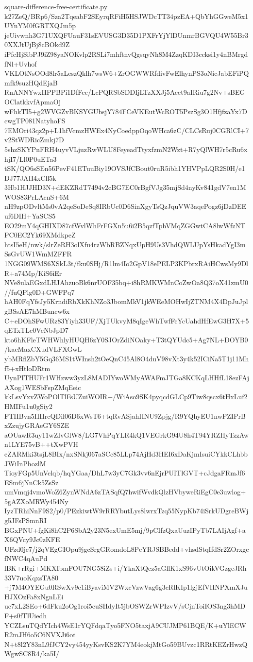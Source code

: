 \documentclass[11pt]{article}
\theoremstyle{definition}
\theoremstyle{remark}
\begin{document}
\begin{filecontents*}[overwrite]{square-difference-free-certificate.py}
k27ZeQ/BRp6/Sza2TqeabF2SEyrqRFiH5HSJWDcTT34pzEA+QbYhGGweM5x1UYnYM0fGRTXQJm5p
jeUivwnh3G71UXQFUauF31sEVUSG3D35D1PXFrYjYlDUnmrBGVQU4W55Br30XXJtUjBj8cBOkd9Z
iPfcHjSibPJ9iZ98yaNOKvlp2RSLi7mhftnvQgsqyNh8M4ZzqKDI3ccksi1y4nBMrgdfNl+Uvhof
VKLOtNsOOd8lr5aLeszQklh7wsW6+ZrOGWWRfdivFwElhynPS3oNicJabEFiPQmfk9suzHQdEjaB
RnANNYwxHPPBPi1DfFec/LcPQRSbSDDIjLTzXXJj5Acet9aIRiu7g2Nv+sBEGOClatkkvfApmaOj
wFhkTI5+g2WVGZvBKSYGUbsjY784FCeVKEutWcROT5PszSg3O1HfjfzaYx7DcwgTP081NatyhoFS
7EMOri43qz2p+L1hfVcmzHWEx4NyCoedppOqoWHca6zC/CLCsRuj0CGRlCI+7v2StWDRicZmkj7D
5shzSKYPnFRH4uyvVLjuzRwWLU8FeyeadTtyxfzmN2Wzt+R7yQlWH7r5cRu6xhjI7/Ll0P0uETa3
tSK/QO6sSEn56PevF41ETuuBiy19OVSJfCBout0ruR5ibh1YHVPpLQR2S0H/e1DJ77JAH4xCll5k
3Hb1HJJHD3N+dEKZRdT7494v2cBG7EC0rBgfVJg35mjSd4nyKv841gdV7en1MWOS83PrLAcnS+6M
nH9zpODvltMs0vA2qeSoDeSq8IRbUc0D6SinXgyTsQzJquVW3aqePogz6jDzDEEuf6DIH+YaSCS5
EO29mY4qGHIXD87cfWvlWhFrFGXn5u6i2B5qzfTphVMqZGGwtCA8lwWfzNTPC0EC2Yk69XMdkpeZ
htsI5eH/nwk/slrZeRH3olXfu4rzWbRBZNqxUpH9Us3VhdQWLUpYsHkadYgI3mSsGvUW1WmMZFFR
1NGG09WMS6XSkL3t/fku0SHj/R1lm4Io2GpV18ePELP3KPbrxRAiHCwsMy9DlR+a74Mp/KiS6iEr
NVe8ulaEGxdLHJAhzuoBk6nrUOF35bq+i8hRMKWMnCoZwOa8Q37oX41zmU0//fuQPlg0D+GWFPq7
hAH0FqYfsJy5KrndiRbXkKhNZo3JbomMkV1jkWEeMOHwIjZTNM4X4DpJuJplgBSsAE7hMBuncw6x
C+eDOhSFwURz83Yiyh33UF/XjTUkvyM8qIgeWhTwfFcYcUahdHfEwG3H7X+5qETxTLe0VeNbJpD7
kto6hKFleTWHWhlyHUQH6zY0SJOrZdiNOaky+T3tQYUdc5+Ag7NL+DOYB0/kaeMaxCXudVLFXGwL
ybMRfiZbY5Gq36MS1tWInsh2tOeQnC45Al8O4duV98vXt3y4k52ICiNa5T1j11Mhf5+xHtloDRtm
UynPITHUFr1WHzww3yzL8MADIYwoWMyAWAFmJTGa8KCKqLHHfL18ezFAjAXog1WESbFspZMqEeic
kkLsvYxvZWoPOlTlFsUZuiWOIR+/WiAso9SK4pyqcdGLCp9Tiw8qscx6tHxLuf2HMIFu1u0gSiy2
FTHBvn5HHrcQDil06D6xWsT6+tqRvASjahHNU9Zpjg/R9YQhyEU1nwPZIPrBxZzujyGRAeGY6SZE
aOUawR3uy11wZIvGlW8/LG7VhPqYLR4kQ1VEGrkG94U8h4T94YRZHyTzzAwn1LYE75vB++tXwPVH
eZARMki3tsjL8BIx/nxSNkj067aSCc85LLp74AjHd3HEI6xDaKjmIsuiCYkkCLhbbJWiInPhozlM
TioyFGp5UnVclqb/hqYGaa/DhL7w3yC7Gk3vv6nEjrPUITlGVT+cJdgaFRmJf6ESm6jNnCk5ZsSz
umVmqj4vmoWoZ6ZynWNdA6zTASqfQ7hwifWvdkQlzHVbyweRiEgC0e3uwlog+5gAZXoMRWy454Ny
IyzTRhiNnF9S2/p0/PEzkiwtW9rRRYbutLys8lwrxTzq55NypKb74iSrkUDgreBWjg5JFsPSmnRI
BGxPNU+fgKi8hC2P6SbA2y23N5exUmE5mj/9pCIfzQxaUuzIPyTb7LAIjAgf+aX6QVcy9Jc0zKFE
UFzd0je7/j2qVEgGIOpu9jgcSrgGRomdoL8PcYRJSBBedd+vhsdStqIfdSr2ZOrxgcfNWC4qAuPd
lBK+rRgi+MKXIbmFOU7NG58iZs+i/YkaXtQcz5aGflK1xS96vUtOikVGzgeJRh33V7uoKqxsTA80
+j7M4OYEGu0RSwXv9c1iByaviMV2WxcVzwVag6g3cRlKIp1lgjEfVHNPXmXJuHJXOzFa8xNgnLEi
uc7xL2SEo+6dFku2oOg1roi5cuSHdyIt5jbOSWZrWPIzvV/sCjnToiIOS3ng3hMDF+s0fTlUiedh
YCZLsuTQdYIch4WsE1rYQFdqaTyo5FNO5taxjA9CUJMP61BQE/K+uYlECWR2mJH6o5C6NVXJi6ot
N+t8l2Y83nL9fJCY2vy454yyKsvKS2K7YM4eokjMtGo59BUvzc1RRtKEZrHwzQWgwSC8R4/ka5I/

\end{filecontents*}
\end{document}
